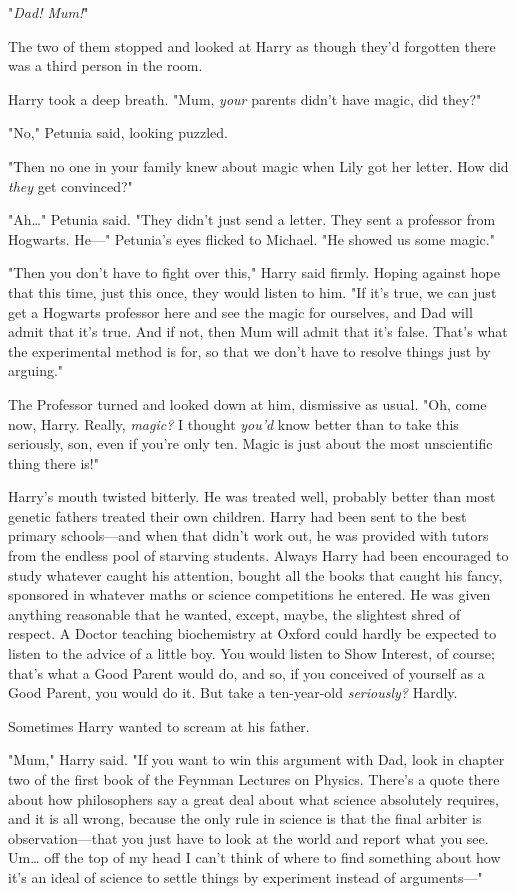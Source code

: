 "\emph{Dad! Mum!}"

The two of them stopped and looked at Harry as though they'd forgotten there
was a third person in the room.

Harry took a deep breath. "Mum, \emph{your} parents didn't have magic, did
they?"

"No," Petunia said, looking puzzled.

"Then no one in your family knew about magic when Lily got her letter. How did
\emph{they} get convinced?"

"Ah{\ldots}" Petunia said. "They didn't just send a letter. They sent a
professor from Hogwarts. He---" Petunia's eyes flicked to Michael. "He showed
us some magic."

"Then you don't have to fight over this," Harry said firmly. Hoping against
hope that this time, just this once, they would listen to him. "If it's true,
we can just get a Hogwarts professor here and see the magic for ourselves, and
Dad will admit that it's true. And if not, then Mum will admit that it's false.
That's what the experimental method is for, so that we don't have to resolve
things just by arguing."

The Professor turned and looked down at him, dismissive as usual. "Oh, come
now, Harry. Really, \emph{magic?} I thought \emph{you'd} know better than to
take this seriously, son, even if you're only ten. Magic is just about the most
unscientific thing there is!"

Harry's mouth twisted bitterly. He was treated well, probably better than most
genetic fathers treated their own children. Harry had been sent to the best
primary schools---and when that didn't work out, he was provided with tutors
from the endless pool of starving students. Always Harry had been encouraged to
study whatever caught his attention, bought all the books that caught his
fancy, sponsored in whatever maths or science competitions he entered. He was
given anything reasonable that he wanted, except, maybe, the slightest shred of
respect. A Doctor teaching biochemistry at Oxford could hardly be expected to
listen to the advice of a little boy. You would listen to Show Interest, of
course; that's what a Good Parent would do, and so, if you conceived of
yourself as a Good Parent, you would do it. But take a ten-year-old
\emph{seriously?} Hardly.

Sometimes Harry wanted to scream at his father.

"Mum," Harry said. "If you want to win this argument with Dad, look in chapter
two of the first book of the Feynman Lectures on Physics. There's a quote there
about how philosophers say a great deal about what science absolutely requires,
and it is all wrong, because the only rule in science is that the final arbiter
is observation---that you just have to look at the world and report what you
see. Um{\ldots} off the top of my head I can't think of where to find something
about how it's an ideal of science to settle things by experiment instead of
arguments---"

